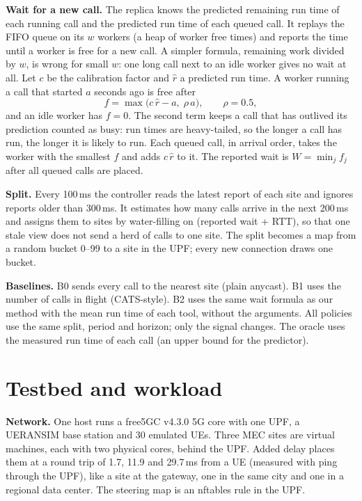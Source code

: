 \documentclass{article}
\begin{document}
\textbf{Wait for a new call.} The replica knows the predicted remaining run time of each
running call and the predicted run time of each queued call. It replays the FIFO queue on
its $w$ workers (a heap of worker free times) and reports the time until a worker is free
for a new call. A simpler formula, remaining work divided by $w$, is wrong for small $w$:
one long call next to an idle worker gives no wait at all. Let $c$ be the calibration
factor and $\hat r$ a predicted run time. A worker running a call that started $a$ seconds
ago is free after
\begin{equation}
f = \max\bigl(c\,\hat r - a,\; \rho\, a\bigr), \qquad \rho = 0.5,
\end{equation}
and an idle worker has $f=0$. The second term keeps a call that has outlived its
prediction counted as busy: run times are heavy-tailed, so the longer a call has run, the
longer it is likely to run. Each queued call, in arrival order, takes the worker with the
smallest $f$ and adds $c\,\hat r$ to it. The reported wait is $W=\min_j f_j$ after all
queued calls are placed.

\textbf{Split.} Every 100\,ms the controller reads the latest report of each site and
ignores reports older than 300\,ms. It estimates how many calls arrive in the next 200\,ms
and assigns them to sites by water-filling on (reported wait + RTT), so that one stale view
does not send a herd of calls to one site. The split becomes a map from a random bucket
0--99 to a site in the UPF; every new connection draws one bucket.

\textbf{Baselines.} B0 sends every call to the nearest site (plain anycast). B1 uses the
number of calls in flight (CATS-style). B2 uses the same wait formula as our method with
the mean run time of each tool, without the arguments. All policies use the same split,
period and horizon; only the signal changes. The oracle uses the measured run time of
each call (an upper bound for the predictor).

\section{Testbed and workload}
\label{sec:setup}
\textbf{Network.} One host runs a free5GC v4.3.0 5G core with one UPF, a UERANSIM base
station and 30 emulated UEs. Three MEC sites are virtual machines, each with two physical
cores, behind the UPF. Added delay places them at a round trip of 1.7, 11.9 and 29.7\,ms
from a UE (measured with ping through the UPF), like a site at the gateway, one in the same
city and one in a regional data center. The steering map is an nftables rule in the UPF.
\end{document}
